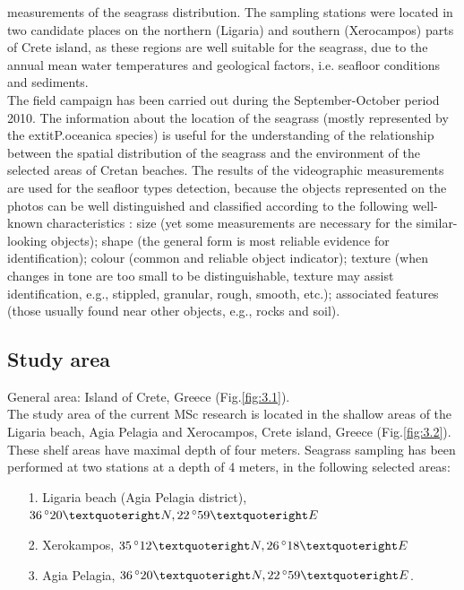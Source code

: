 \documentclass[11pt]{article}
\begin{document}
measurements of the seagrass distribution.
The sampling stations were located in two candidate places on the northern (Ligaria) and southern
(Xerocampos) parts of Crete island, as these regions are well suitable for the seagrass, due to the
annual mean water temperatures and geological factors, i.e. seafloor conditions and sediments. \\ The
field campaign has been carried out during the September-October period 2010. 
The information about the location of the seagrass (mostly represented by the 	extit{P.oceanica} species) is useful for the
understanding of the relationship between the spatial distribution of the seagrass and the environment
of the selected areas of Cretan beaches. The results of the videographic measurements are used for the
seafloor types detection, because the objects represented on the photos can be well distinguished and
classified according to the following well-known characteristics \cite{Butler87}\label{Butler87}: size (yet some
measurements are necessary for the similar-looking objects); shape (the general form is most reliable
evidence for identification); colour (common and reliable object indicator); texture (when changes in
tone are too small to be distinguishable, texture may assist identification, e.g., stippled, granular,
rough, smooth, etc.); associated features (those usually found near other objects, e.g., rocks and soil).

\subsection{Study area}
General area: Island of Crete, Greece (Fig.\ref{fig:3.1}).\\
The study area of the current MSc research is located in the shallow areas of the Ligaria beach, Agia
Pelagia and Xerocampos, Crete island, Greece (Fig.\ref{fig:3.2}). These shelf areas have maximal depth of four meters.
Seagrass sampling has been performed at two stations at a depth of 4 meters, in the following selected
areas:
\begin{itemize}
	\item [1.] Ligaria beach (Agia Pelagia district), $36\,^{\circ}20\textquoteright N, 22\,^{\circ}59\textquoteright E$ 
	\item [2.] Xerokampos, $35\,^{\circ}12\textquoteright N, 26\,^{\circ}18\textquoteright E$
	\item [3.] Agia Pelagia, $36\,^{\circ}20\textquoteright N, 22\,^{\circ}59\textquoteright E$.
\end{itemize}
\end{document}

